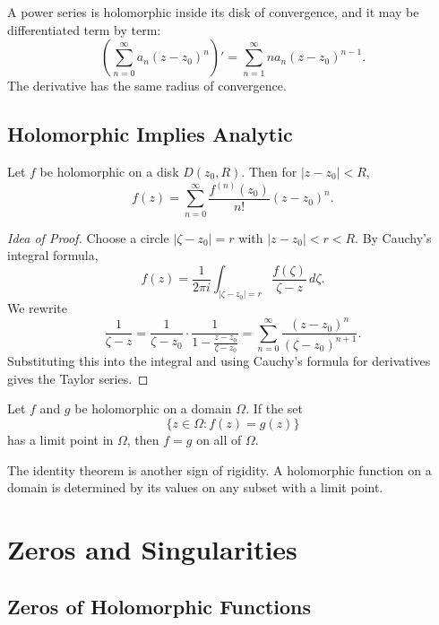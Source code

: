 \begin{theorem}
A power series is holomorphic inside its disk of convergence, and it may be differentiated term by term:
\[
    \left(\sum_{n=0}^{\infty}a_n(z-z_0)^n\right)'
    =\sum_{n=1}^{\infty}na_n(z-z_0)^{n-1}.
\]
The derivative has the same radius of convergence.
\end{theorem}

\subsection{Holomorphic Implies Analytic}

\begin{theorem}
Let $f$ be holomorphic on a disk $D(z_0,R)$. Then for $|z-z_0|<R$,
\[
    f(z)=\sum_{n=0}^{\infty}\frac{f^{(n)}(z_0)}{n!}(z-z_0)^n.
\]
\end{theorem}

\begin{proof}[Idea of Proof]
Choose a circle $|\zeta-z_0|=r$ with $|z-z_0|<r<R$. By Cauchy's integral formula,
\[
    f(z)=\frac{1}{2\pi i}\int_{|\zeta-z_0|=r}\frac{f(\zeta)}{\zeta-z}\,d\zeta.
\]
We rewrite
\[
    \frac{1}{\zeta-z}=\frac{1}{\zeta-z_0}\cdot\frac{1}{1-\frac{z-z_0}{\zeta-z_0}}
    =\sum_{n=0}^{\infty}\frac{(z-z_0)^n}{(\zeta-z_0)^{n+1}}.
\]
Substituting this into the integral and using Cauchy's formula for derivatives gives the Taylor series.
\end{proof}

\begin{theorem}
Let $f$ and $g$ be holomorphic on a domain $\Omega$. If the set
\[
    \{z\in\Omega:f(z)=g(z)\}
\]
has a limit point in $\Omega$, then $f=g$ on all of $\Omega$.
\end{theorem}

\begin{remark}
The identity theorem is another sign of rigidity. A holomorphic function on a domain is determined by its values on any subset with a limit point.
\end{remark}

\section{Zeros and Singularities}

\subsection{Zeros of Holomorphic Functions}

